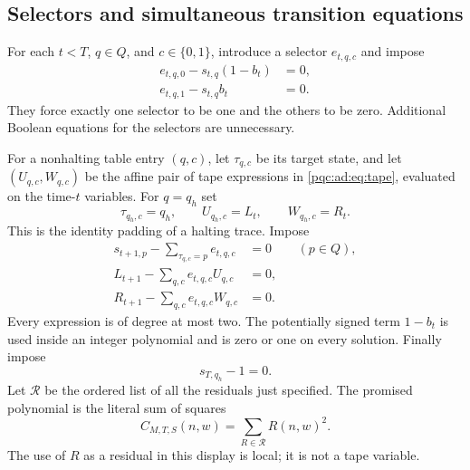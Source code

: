 \documentclass[11pt,letterpaper]{article}
\numberwithin{equation}{section}
\theoremstyle{definition}
\theoremstyle{remark}
\newcommand{\Bit}{\{0,1\}}
\begin{document}
\subsection{Selectors and simultaneous transition equations}
For each $t<T$, $q\in Q$, and $c\in\Bit$, introduce a selector $e_{t,q,c}$
and impose
\begin{align}
e_{t,q,0}-s_{t,q}(1-b_t)&=0,\label{pqc:ad:eq:e0}\\
e_{t,q,1}-s_{t,q}b_t&=0.\label{pqc:ad:eq:e1}
\end{align}
They force exactly one selector to be one and the others to be zero.
Additional Boolean equations for the selectors are unnecessary.

For a nonhalting table entry $(q,c)$, let $\tau_{q,c}$ be its target state,
and let $(U_{q,c},W_{q,c})$ be the affine pair of tape expressions in
\eqref{pqc:ad:eq:tape}, evaluated on the time-$t$ variables. For $q=q_h$ set
\[
\tau_{q_h,c}=q_h,\qquad U_{q_h,c}=L_t,\qquad W_{q_h,c}=R_t.
\]
This is the identity padding of a halting trace. Impose
\begin{align}
s_{t+1,p}-\sum_{\tau_{q,c}=p}e_{t,q,c}&=0 &&(p\in Q),\label{pqc:ad:eq:stateupdate}\\
L_{t+1}-\sum_{q,c}e_{t,q,c}U_{q,c}&=0,\label{pqc:ad:eq:Lupdate}\\
R_{t+1}-\sum_{q,c}e_{t,q,c}W_{q,c}&=0.\label{pqc:ad:eq:Rupdate}
\end{align}
Every expression is of degree at most two. The potentially signed term
$1-b_t$ is used inside an integer polynomial and is zero or one on every
solution. Finally impose
\begin{equation}\label{pqc:ad:eq:finalhalt}
s_{T,q_h}-1=0.
\end{equation}
Let $\mathcal R$ be the ordered list of all the residuals just specified.
The promised polynomial is the literal sum of squares
\begin{equation}\label{pqc:ad:eq:certificate}
C_{M,T,S}(n,w)=\sum_{R\in\mathcal R}R(n,w)^2.
\end{equation}
The use of $R$ as a residual in this display is local; it is not a tape
variable.
\end{document}
